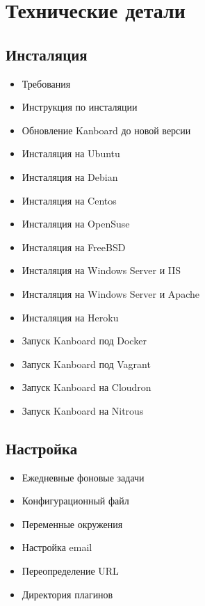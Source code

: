 \documentclass[letterpaper,10pt,russian]{sphinxmanual}
\begin{document}
\chapter{Технические детали}
\label{index:technical-details}

\section{Инсталяция}
\label{index:installation}\begin{itemize}
\item {} 
Требования

\item {} 
Инструкция по инсталяции

\item {} 
Обновление Kanboard до новой версии

\item {} 
Инсталяция на Ubuntu

\item {} 
Инсталяция на Debian

\item {} 
Инсталяция на Centos

\item {} 
Инсталяция на OpenSuse

\item {} 
Инсталяция на FreeBSD

\item {} 
Инсталяция на Windows Server и IIS

\item {} 
Инсталяция на Windows Server и Apache

\item {} 
Инсталяция на Heroku

\item {} 
Запуск Kanboard под Docker

\item {} 
Запуск Kanboard под Vagrant

\item {} 
Запуск Kanboard на Cloudron

\item {} 
Запуск Kanboard на Nitrous

\end{itemize}


\section{Настройка}
\label{index:configuration}\begin{itemize}
\item {} 
Ежедневные фоновые задачи

\item {} 
Конфигурационный файл

\item {} 
Переменные окружения

\item {} 
Настройка email

\item {} 
Переопределение URL

\item {} 
Директория плагинов

\end{itemize}
\end{document}
